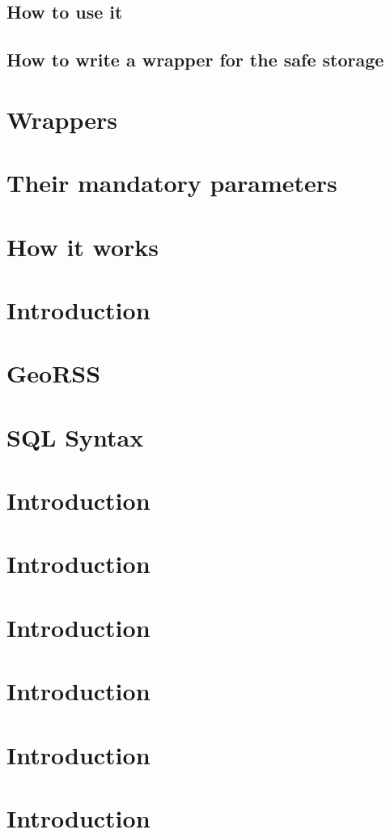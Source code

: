 \subsection{How to use it }
\subsection{How to write a wrapper for the safe storage}
\section{Wrappers}
\section{Their mandatory parameters}
\section{How it works}
\section{Introduction}
\section{GeoRSS}
\section{SQL Syntax}
\section{Introduction}
\section{Introduction}
\section{Introduction}
\section{Introduction}
\section{Introduction}
\section{Introduction}
